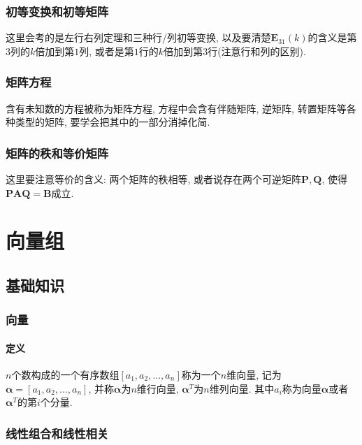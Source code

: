 \subsection{初等变换和初等矩阵}
这里会考的是左行右列定理和三种行/列初等变换, 以及要清楚$ \bm{E}_{31}(k) $的含义是第$ 3 $列的$ k $倍加到第$ 1 $列, 或者是第$ 1 $行的$ k $倍加到第$ 3 $行(注意行和列的区别).
\subsection{矩阵方程}
含有未知数的方程被称为矩阵方程, 方程中会含有伴随矩阵, 逆矩阵, 转置矩阵等各种类型的矩阵, 要学会把其中的一部分消掉化简.
\subsection{矩阵的秩和等价矩阵}
这里要注意等价的含义: 两个矩阵的秩相等, 或者说存在两个可逆矩阵$ \bm{P}, \bm{Q} $, 使得$ \bm{P}\bm{A}\bm{Q}=\bm{B} $成立.
\chapter{向量组}
\section{基础知识}
\subsection{向量}
\subsubsection{定义}
$ n $个数构成的一个有序数组$ [a_{1},a_{2},...,a_{n}] $称为一个$ n $维向量, 记为$ \bm{\alpha} = [a_{1},a_{2},...,a_{n}] $, 并称$ \bm{\alpha} $为$ n $维行向量, $ \bm{\alpha}^{T} $为$ n $维列向量. 其中$ a_{i} $称为向量$ \bm{\alpha} $或者$ \bm{\alpha}^{T} $的第$ i $个分量.
\subsection{线性组合和线性相关}
